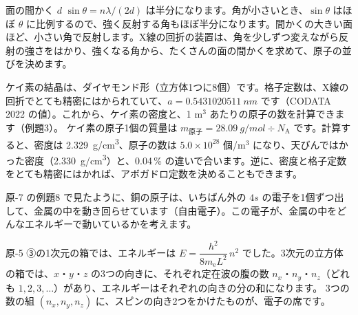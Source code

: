 \begin{phbaisuru}{面の間かく $d$}
$\sin\theta=n\lambda/(2d)$ は半分になります。角が小さいとき、$\sin\theta$ はほぼ $\theta$ に比例するので、強く反射する角もほぼ半分になります。間かくの大きい面ほど、小さい角で反射します。X線の回折の装置は、角を少しずつ変えながら反射の強さをはかり、強くなる角から、たくさんの面の間かくを求めて、原子の並びを決めます。
\end{phbaisuru}

\label{ph:原-8:sec3}
ケイ素の結晶は、ダイヤモンド形（立方体1つに8個）です。格子定数は、X線の回折でとても精密にはかられていて、$a=\qty{0.5431020511}{nm}$ です（CODATA 2022 の値）。これから、ケイ素の密度と、1 m$^3$ あたりの原子の数を計算できます（例題3）。
\label{ph:原-8:density}ケイ素の原子1個の質量は $m_{\text{原子}}=\qty{28.09}{g/mol}\div N_{\mathrm A}$ です。計算すると、密度は \qty{2.329}{g/cm^3}、原子の数は $5.0\times10^{28}$ 個/m$^3$ になり、天びんではかった密度（\qty{2.330}{g/cm^3}）と、0.04\,\% の違いで合います。逆に、密度と格子定数をとても精密にはかれば、アボガドロ定数を決めることもできます。


\label{ph:原-8:sec4}
原-7 の例題8 で見たように、銅の原子は、いちばん外の $4s$ の電子を1個ずつ出して、金属の中を動き回らせています（自由電子）。この電子が、金属の中をどんなエネルギーで動いているかを考えます。

\begin{phmodel}[自由電子]
\end{phmodel}

原-5 ③の1次元の箱では、エネルギーは $E=\dfrac{h^2}{8m_{\mathrm e}L^2}\,n^2$ でした。3次元の立方体の箱では、$x$・$y$・$z$ の3つの向きに、それぞれ定在波の腹の数 $n_x$・$n_y$・$n_z$（どれも $1,2,3,\ldots$）があり、エネルギーはそれぞれの向きの分の和になります。
3つの数の組 $(n_x,n_y,n_z)$ に、スピンの向き2つをかけたものが、電子の席です。

